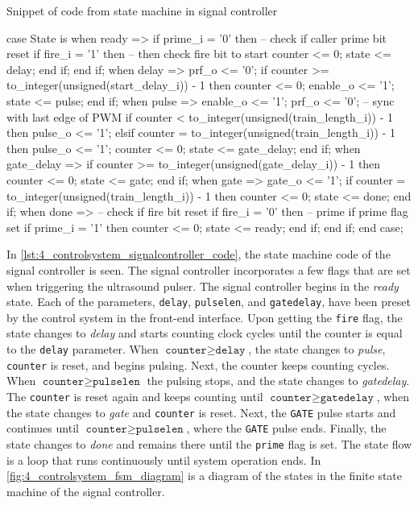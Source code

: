 \begin{listing}[htbp]
\caption{Snippet of code from state machine in signal controller}
\label{lst:4_controlsystem_signalcontroller_code}
\begin{mintedvhdl}
case State is
	when ready =>
	if prime_i = '0' then -- check if caller prime bit reset
		if fire_i = '1' then -- then check fire bit to start
			counter <= 0;
			state <= delay;
		end if;
	end if;
when delay =>
	prf_o <= '0';
	if counter >= to_integer(unsigned(start_delay_i)) - 1 then
		counter <= 0;
		enable_o <= '1';
		state <= pulse;
	end if;
when pulse =>
	enable_o <= '1';
	prf_o <= '0'; -- sync with last edge of PWM
	if counter < to_integer(unsigned(train_length_i)) - 1 then
		pulse_o <= '1';
	elsif counter = to_integer(unsigned(train_length_i)) - 1 then
		pulse_o <= '1';
		counter <= 0;
		state <= gate_delay;
	end if;
when gate_delay =>
	if counter >= to_integer(unsigned(gate_delay_i)) - 1 then
		counter <= 0;
		state <= gate;
	end if;
when gate =>
	gate_o <= '1';
	if counter = to_integer(unsigned(train_length_i)) - 1 then
		counter <= 0;
		state <= done;
	end if;
when done =>
	-- check if fire bit reset
	if fire_i = '0' then
		-- prime if prime flag set
		if prime_i = '1' then
			counter <= 0;
			state <= ready;
		end if;
	end if;
end case;
\end{mintedvhdl}
\end{listing}
In \cref{lst:4_controlsystem_signalcontroller_code}, the state machine code of the signal controller is seen. The signal controller incorporates a few flags that are set when triggering the ultrasound pulser. The signal controller begins in the \textit{ready} state. Each of the parameters, \texttt{delay}, \texttt{pulselen}, and \texttt{gatedelay}, have been preset by the control system in the front-end interface. Upon getting the \texttt{fire} flag, the state changes to \textit{delay} and starts counting clock cycles until the counter is equal to the \texttt{delay} parameter. When $\texttt{counter}\ge\texttt{delay}$, the state changes to \textit{pulse}, \texttt{counter} is reset, and begins pulsing. Next, the counter keeps counting cycles. When $\texttt{counter}\ge\texttt{pulselen}$ the pulsing stops, and the state changes to \textit{gatedelay}. The \texttt{counter} is reset again and keeps counting until $\texttt{counter}\ge\texttt{gatedelay}$, when the state changes to \textit{gate} and \texttt{counter} is reset. Next, the \texttt{GATE} pulse starts and continues until $\texttt{counter}\ge\texttt{pulselen}$, where the \texttt{GATE} pulse ends. Finally, the state changes to \textit{done} and remains there until the \texttt{prime} flag is set. The state flow is a loop that runs continuously until system operation ends. In \cref{fig:4_controlsystem_fsm_diagram} is a diagram of the states in the finite state machine of the signal controller.

